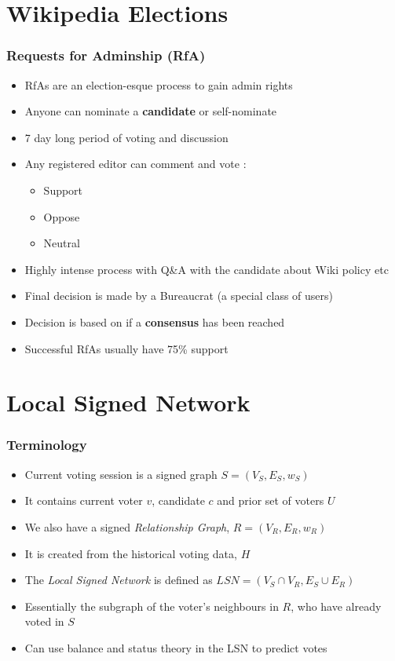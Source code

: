 \documentclass{beamer}
\begin{document}
\section{Wikipedia Elections}
\begin{frame}
    \frametitle{Requests for Adminship (RfA)}    
    \begin{itemize}
        \item RfAs are an election-esque process to gain admin rights
        \item Anyone can nominate a \textbf{candidate} or self-nominate
        \item 7 day long period of voting and discussion
        \item Any registered editor can comment and vote :
        \begin{itemize}
            \item Support 
            \item Oppose
            \item Neutral
        \end{itemize}
        \item Highly intense process with Q\&A with the candidate about Wiki policy etc
        \item Final decision is made by a Bureaucrat (a special class of users)
        \item Decision is based on if a \textbf{consensus} has been reached
        \item Successful RfAs usually have 75\% support
    \end{itemize}


\end{frame}

\section{Local Signed Network}
\begin{frame}
    \frametitle{Terminology}
    \begin{itemize}
        \item Current voting session is a signed graph $S=(V_S,E_S,w_S)$
        \item It contains current voter $v$, candidate $c$ and prior set of voters $U$
        \item We also have a signed \textit{Relationship Graph}, $R = (V_R,E_R,w_R)$
        \item It is created from the historical voting data, $H$
        \item The \textit{Local Signed Network} is defined as $LSN = ( V_S \cap V_R, E_S\cup E_R)$
        \item Essentially the subgraph of the voter's neighbours in $R$, who have already voted in $S$
        \item Can use balance and status theory in the LSN to predict votes
    \end{itemize}
    

\end{frame}
\end{document}
